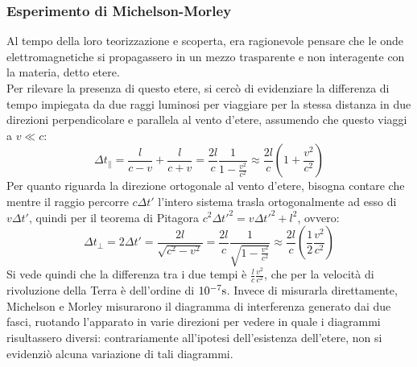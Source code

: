 \subsubsection{Esperimento di Michelson-Morley}

Al tempo della loro teorizzazione e scoperta, era ragionevole pensare che le onde elettromagnetiche si propagassero in un mezzo trasparente e non interagente con la materia, detto etere. \\ 
%
Per rilevare la presenza di questo etere, si cercò di evidenziare la differenza di tempo impiegata da due raggi luminosi per viaggiare per la stessa distanza in due direzioni perpendicolare e parallela al vento d'etere, assumendo che questo viaggi a $ v \ll c $:
\begin{equation}
	\Delta t_{\parallel} = \frac{l}{c-v} + \frac{l}{c+v} = \frac{2l}{c}\frac{1}{1 - \frac{v^2}{c^2}} \approx \frac{2l}{c}\left(1 + \frac{v^2}{c^2}\right)
	\label{eq:2}
\end{equation}
Per quanto riguarda la direzione ortogonale al vento d'etere, bisogna contare che mentre il raggio percorre $ c\Delta t' $ l'intero sistema trasla ortogonalmente ad esso di $ v\Delta t' $, quindi per il teorema di Pitagora $ c^2 \Delta t'^2 = v \Delta t'^2 + l^2 $, ovvero:
\begin{equation}
	\Delta t_{\perp} = 2 \Delta t' = \frac{2l}{\sqrt{c^2 - v^2}} = \frac{2l}{c} \frac{1}{\sqrt{1 - \frac{v^2}{c^2}}} \approx \frac{2l}{c} \left(\frac{1}{2}\frac{v^2}{c^2}\right)
	\label{eq:3}
\end{equation}
Si vede quindi che la differenza tra i due tempi è $ \frac{l}{c}\frac{v^2}{c^2} $, che per la velocità di rivoluzione della Terra è dell'ordine di $ 10^{-7} \text{s} $. Invece di misurarla direttamente, Michelson e Morley misurarono il diagramma di interferenza generato dai due fasci, ruotando l'apparato in varie direzioni per vedere in quale i diagrammi risultassero diversi: contrariamente all'ipotesi dell'esistenza dell'etere, non si evidenziò alcuna variazione di tali diagrammi.


%
%


